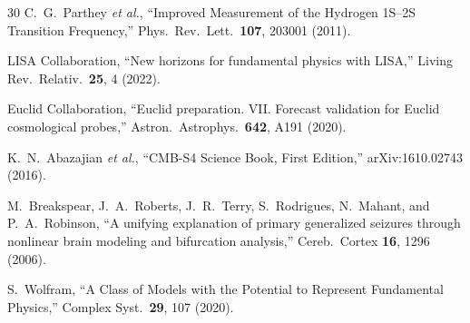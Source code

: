 \documentclass[aps,prd,twocolumn,superscriptaddress,longbibliography,nofootinbib]{revtex4-2}
\begin{document}
\begin{thebibliography}{30}
C.~G.~Parthey \textit{et al.},
``Improved Measurement of the Hydrogen 1S--2S Transition Frequency,''
Phys.\ Rev.\ Lett.\ \textbf{107}, 203001 (2011).

LISA Collaboration,
``New horizons for fundamental physics with LISA,''
Living Rev.\ Relativ.\ \textbf{25}, 4 (2022).

Euclid Collaboration,
``Euclid preparation. VII. Forecast validation for Euclid
cosmological probes,''
Astron.\ Astrophys.\ \textbf{642}, A191 (2020).

K.~N.~Abazajian \textit{et al.},
``CMB-S4 Science Book, First Edition,''
arXiv:1610.02743 (2016).

M.~Breakspear, J.~A.~Roberts, J.~R.~Terry, S.~Rodrigues,
N.~Mahant, and P.~A.~Robinson,
``A unifying explanation of primary generalized seizures through
nonlinear brain modeling and bifurcation analysis,''
Cereb.\ Cortex \textbf{16}, 1296 (2006).

S.~Wolfram,
``A Class of Models with the Potential to Represent Fundamental
Physics,''
Complex Syst.\ \textbf{29}, 107 (2020).

\end{thebibliography}
\end{document}
